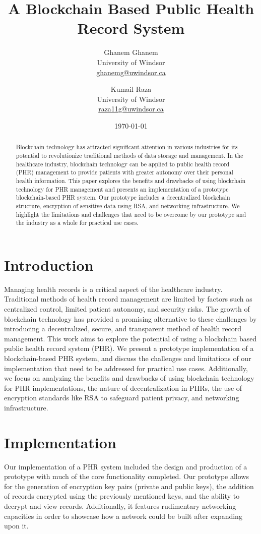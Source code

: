 \documentclass{article}
\title{A Blockchain Based Public Health Record System}
\author{
    \begin{tabular}{c}
        Ghanem Ghanem \\
        \small University of Windsor \\
        \small \href{mailto:ghanemg@uwindsor.ca}{ghanemg@uwindsor.ca}
    \end{tabular}
    \and 
    \begin{tabular}{c}
        Kumail Raza \\
        \small University of Windsor \\
        \small \href{mailto:raza11g@uwindsor.ca}{raza11g@uwindsor.ca}
    \end{tabular}
}
\date{\today}
\begin{document}
\maketitle

\begin{abstract}
Blockchain technology has attracted significant attention in various industries for its potential to revolutionize traditional methods of data storage and management. In the healthcare industry, blockchain technology can be applied to public health record (PHR) management to provide patients with greater autonomy over their personal health information. This paper explores the benefits and drawbacks of using blockchain technology for PHR management and presents an implementation of a prototype blockchain-based PHR system. Our prototype includes a decentralized blockchain structure, encryption of sensitive data using RSA, and networking infrastructure. We highlight the limitations and challenges that need to be overcome by our prototype and the industry as a whole for practical use cases.
\end{abstract}


\section{Introduction}
Managing health records is a critical aspect of the healthcare industry. Traditional methods of health record management are limited by factors such as centralized control, limited patient autonomy, and security risks. The growth of blockchain technology has provided a promising alternative to these challenges by introducing a decentralized, secure, and transparent method of health record management. This work aims to explore the potential of using a blockchain based public health record system (PHR). We present a prototype implementation of a blockchain-based PHR system, and discuss the challenges and limitations of our implementation that need to be addressed for practical use cases. Additionally, we focus on analyzing the benefits and drawbacks of using blockchain technology for PHR implementations, the nature of decentralization in PHRs, the use of encryption standards like RSA to safeguard patient privacy, and networking infrastructure.

\section{Implementation}
Our implementation of a PHR system included the design and production of a prototype with much of the core functionality completed. Our prototype allows for the generation of encryption key pairs (private and public keys), the addition of records encrypted using the previously mentioned keys, and the ability to decrypt and view records. Additionally, it features rudimentary networking capacities in order to showcase how a network could be built after expanding upon it.
\end{document}
